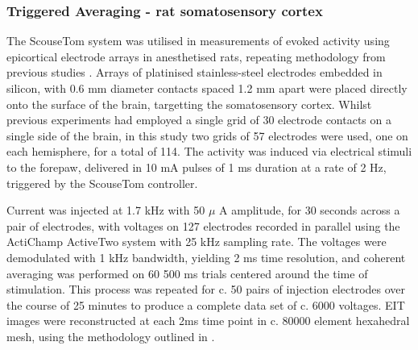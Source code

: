 \subsubsection{Triggered Averaging - rat somatosensory cortex}

The ScouseTom system was utilised in measurements of evoked activity using epicortical electrode arrays in anesthetised rats, repeating methodology from previous studies \cite{Aristovich_2016} \cite{Vongerichten_2016}. Arrays of platinised stainless-steel electrodes embedded in silicon, with 0.6 mm diameter contacts spaced 1.2 mm apart were placed directly onto the surface of the brain, targetting the somatosensory cortex. Whilst previous experiments had employed a single grid of 30 electrode contacts on a single side of the brain, in this study two grids of 57 electrodes were used, one on each hemisphere, for a total of 114. The activity was induced via electrical stimuli to the forepaw, delivered in 10 mA pulses of 1 ms duration at a rate of 2 Hz, triggered by the ScouseTom controller.

Current was injected at 1.7 kHz with 50 $\mu$ A amplitude, for 30 seconds across a pair of electrodes, with voltages on 127 electrodes recorded in parallel using the ActiChamp ActiveTwo system with 25 kHz sampling rate. The voltages were demodulated with 1 kHz bandwidth, yielding 2 ms time resolution, and coherent averaging was performed on 60 500 ms trials centered around the time of stimulation. This process was repeated for c. 50 pairs of injection electrodes over the course of 25 minutes to produce a complete data set of c. 6000 voltages. EIT images were reconstructed at each 2ms time point in c. 80000 element hexahedral mesh, using the methodology outlined in \cite{Aristovich_2014}.

